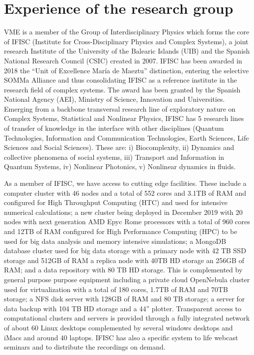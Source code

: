 \documentclass[authoryear,1p,12pt]{elsarticle}
\begin{document}
     \section{Experience of the research group}
     VME is a member of the Group of Interdisciplinary Physics which
     forms the core of IFISC (Institute for Cross-Disciplinary Physics
     and Complex Systems), a joint research Institute of the
     University of the Balearic Islands (UIB) and the Spanish National
     Research Council (CSIC) created in 2007. IFISC has been awarded
     in 2018 the “Unit of Excellence María de Maeztu” distinction,
     entering the selective SOMMa Alliance and thus consolidating
     IFISC as a reference institute in the research field of complex
     systems. The award has been granted by the Spanish National
     Agency (AEI), Ministry of Science, Innovation and
     Universities. Emerging from a backbone transversal research line
     of exploratory nature on Complex Systems, Statistical and
     Nonlinear Physics, IFISC has 5 research lines of transfer of
     knowledge in the interface with other disciplines (Quantum
     Technologies, Information and Communication Technologies, Earth
     Sciences, Life Sciences and Social Sciences). These are: i)
     Biocomplexity, ii) Dynamics and collective phenomena of social
     systems, iii) Transport and Information in Quantum Systems, iv)
     Nonlinear Photonics, v) Nonlinear dynamics in fluids.

     
     As a member of IFISC, we have access to cutting edge
     facilities. These include a computer cluster with 46 nodes and a
     total of 552 cores and 3.1TB of RAM and configured for High
     Throughput Computing (HTC) and used for intensive numerical
     calculations; a new cluster being deployed in December 2019 with
     20 nodes with next generation AMD Epyc Rome processors with a
     total of 960 cores and 12TB of RAM configured for High
     Performance Computing (HPC) to be used for big data analysis and
     memory intensive simulations; a MongoDB database cluster used for
     big data storage with a primary node with 42 TB SSD storage and
     512GB of RAM a replica node with 40TB HD storage an 256GB of RAM;
     and a data repository with 80 TB HD storage. This is complemented
     by general purpose purpose equipment including a private cloud
     OpenNebula cluster used for virtualization with a total of 180
     cores, 1.7TB of RAM and 70TB storage; a NFS disk server with
     128GB of RAM and 80 TB storage; a server for data backup with 104
     TB HD storage and a 44'' plotter. Transparent access to
     computational clusters and servers is provided through a fully
     integrated network of about 60 Linux desktops complemented by
     several windows desktops and iMacs and around 40 laptops. IFISC
     has also a specific system to life webcast seminars and to
     distribute the recordings on demand.
     
\end{document}
